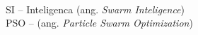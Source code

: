  \\
SI -- Inteligenca  (ang. \textit{Swarm Inteligence}) \\
PSO --  (ang. \textit{Particle Swarm Optimization}) \\